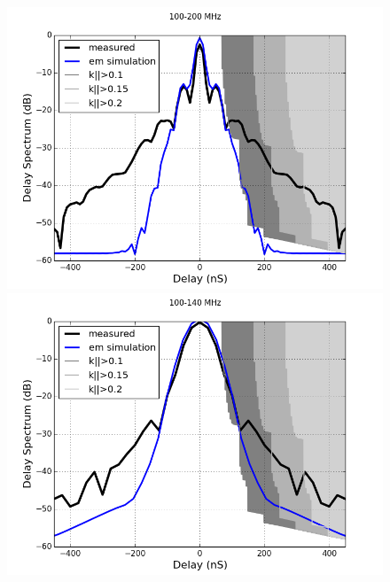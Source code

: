 \documentclass[twocolumn]{emulateapj}
\begin{document}
 
\begin{figure}[ht]
\begin{minipage}[b]{0.5\linewidth}
\centering
\includegraphics[angle=0, width=\linewidth]{GB_reflectometry_part3/plot/100_200.png}
\end{minipage}
\hspace{0.1cm}
\begin{minipage}[b]{0.5\linewidth}
\centering
\includegraphics[angle=0, width=\linewidth]{GB_reflectometry_part3/plot/100_140.png}
\end{minipage}
\vspace{0.1cm}
\begin{minipage}[b]{0.5\linewidth}
\centering

\end{minipage}
\end{figure}
\end{document}
